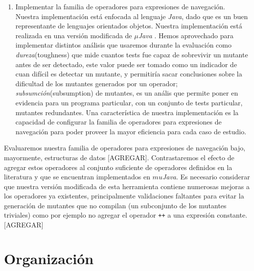 \begin{enumerate}
	\item Implementar la familia de operadores para expresiones de navegaci\'on. Nuestra implementaci\'on est\'a enfocada al lenguaje \emph{Java}, dado que es un buen representante de lenguajes orientados objetos. Nuestra implementaci\'on est\'a realizada en una versi\'on modificada de \emph{$\mu$Java} \cite{bibliography.mutation.tools.muJavaMaOK05}. Hemos aprovechado para implementar distintos an\'alisis que usaremos durante la evaluaci\'on como \emph{dureza}(toughness) que mide cuantos tests fue capaz de sobrevivir un mutante antes de ser detectado, este valor puede ser tomado como un indicador de cuan dif\'icil es detectar un mutante, y permitir\'ia sacar conclusiones sobre la dificultad de los mutantes generados por un operador; \emph{subsumci\'on}(subsumption) de mutantes, es un an\'alis que permite poner en evidencia para un programa particular, con un conjunto de tests particular, mutantes redundantes. Una caracter\'istica de nuestra implementaci\'on es la capacidad de configurar la familia de operadores para expresiones de navegaci\'on para poder proveer la mayor eficiencia para cada caso de estudio.
\end{enumerate}

Evaluaremos nuestra familia de operadores para expresiones de navegaci\'on bajo, mayormente, estructuras de datos [AGREGAR]. Contrastaremos el efecto de agregar estos operadores al conjunto suficiente de operadores definidos en la literatura y que se encuentran implementados en \emph{$mu$Java}. Es necesario considerar que nuestra versi\'on modificada de esta herramienta contiene numerosas mejoras a los operadores ya existentes, principalmente validaciones faltantes para evitar la generaci\'on de mutantes que no compilan (un subconjunto de los mutantes triviales) como por ejemplo no agregar el operador \texttt{++} a una expresi\'on constante.
[AGREGAR]


\section{Organizaci\'on}
\label{sec:intro.organizacion}


